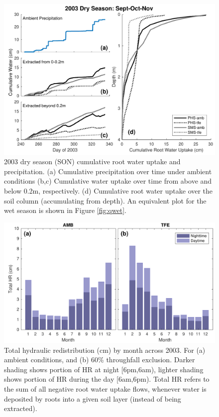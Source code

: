 \documentclass[draft,linenumbers]{agujournal}
\begin{document}
        \clearpage
    \begin{figure}[h]
     \centering
     \includegraphics[width=30pc]{figs/qdry.pdf}
     \caption{2003 dry season (SON) cumulative root water uptake and precipitation. 
     (a) Cumulative precipitation over time under ambient conditions
     (b,c) Cumulative water uptake over time from above and below 0.2m, respectively.
     (d) Cumulative root water uptake over the soil column (accumulating from depth).
     An equivalent plot for the wet season is shown in Figure \ref{fig:qwet}.
     }
     \label{fig:qdry}
  \end{figure}
               
    \clearpage
    \begin{figure}[h]
     \centering
     \includegraphics[width=30pc]{figs/hr.pdf}
     \caption{Total hydraulic redistribution (cm) by month across 2003. For (a) ambient  conditions, and (b) 60\% throughfall exclusion. 
     Darker shading shows portion of HR at night [6pm,6am), lighter shading shows portion of HR during the day [6am,6pm).
     Total HR refers to the sum of all negative root water uptake flows, whenever water is deposited by roots into a given soil layer (instead of being extracted).}
     \label{fig:hr}
  \end{figure}
\end{document}
